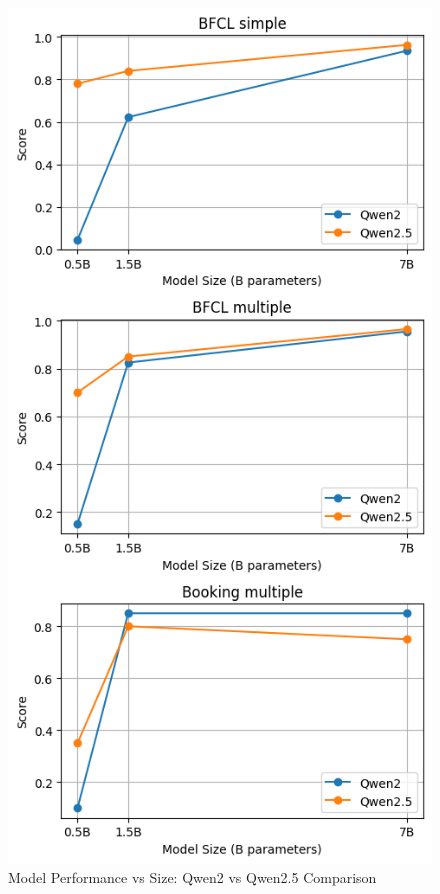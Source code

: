 \documentclass[12pt]{extarticle}
\begin{document}
\begin{figure}[h]
    \centering
    \includegraphics[height=0.95\textheight]{output.png}
    \caption{Model Performance vs Size: Qwen2 vs Qwen2.5 Comparison}
    \label{fig:model_performance}
\end{figure}
\end{document}
